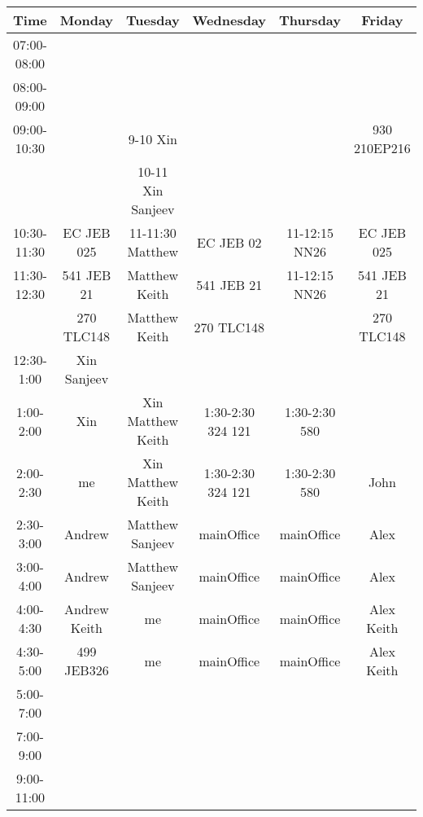 \documentclass{article}  %
\begin{document}
\begin{table}[!hbp]
\begin{tabular}{|c|c|c|c|c|c|}   %
\hline %
\hline %
Time        & Monday       & Tuesday           & Wednesday  & Thursday      & Friday \\
\hline
07:00-08:00 &              &                   &            &               &  \\
\hline
08:00-09:00 &              &                   &            &               &  \\
\hline
\hline
09:00-10:30 &              & 9-10 Xin          &            &               & 930 210EP216 \\
            &              & 10-11 Xin Sanjeev &            &               &  \\
\hline
10:30-11:30 & EC JEB 025   & 11-11:30 Matthew  & EC JEB 02  & 11-12:15 NN26 & EC JEB 025 \\
\hline
11:30-12:30 & 541 JEB 21   & Matthew Keith     & 541 JEB 21 & 11-12:15 NN26 & 541 JEB 21 \\
            & 270 TLC148   & Matthew Keith     & 270 TLC148 &               & 270 TLC148 \\
\hline
12:30-1:00  & Xin Sanjeev  &                   &            &               & \\
\hline
1:00-2:00   & Xin          & Xin Matthew Keith & 1:30-2:30 324 121 & 1:30-2:30 580 & \\
\hline
2:00-2:30   & me           & Xin Matthew Keith & 1:30-2:30 324 121 & 1:30-2:30 580 & John   \\
2:30-3:00   & Andrew       & Matthew Sanjeev   & mainOffice & mainOffice    & Alex   \\
\hline
3:00-4:00   & Andrew       & Matthew Sanjeev   & mainOffice & mainOffice    & Alex   \\
\hline
4:00-4:30   & Andrew Keith & me                & mainOffice & mainOffice    & Alex Keith\\
4:30-5:00   & 499 JEB326   & me                & mainOffice & mainOffice    & Alex Keith\\
\hline
\hline
5:00-7:00   &  &  &  &  & \\
\hline
\hline
7:00-9:00   &  &  &  &  & \\
\hline
9:00-11:00  &  &  &  &  & \\
\hline
\hline

\end{tabular}

\end{table}
\end{document}

